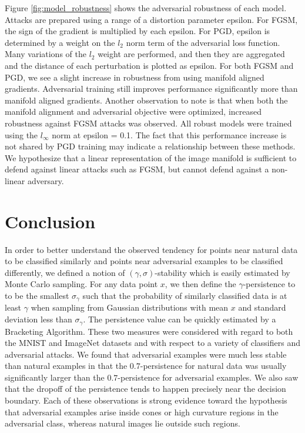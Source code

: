 Figure \ref{fig:model_robustness} shows the adversarial robustness of each model. Attacks are prepared using a range of a distortion parameter epsilon. For FGSM, the sign of the gradient is multiplied by each epsilon. For PGD, epsilon is determined by a weight on the $l_2$ norm term of the adversarial loss function. Many variations of the $l_2$ weight are performed, and then they are aggregated and the distance of each perturbation is plotted as epsilon. For both FGSM and PGD, we see a slight increase in robustness from using manifold aligned gradients. Adversarial training still improves performance significantly more than manifold aligned gradients. Another observation to note is that when both the manifold alignment and adversarial objective were optimized, increased robustness against FGSM attacks was observed. All robust models were trained using the $l_\infty$ norm at epsilon = 0.1. The fact that this performance increase is not shared by PGD training may indicate a relationship between these methods. We hypothesize that a linear representation of the image manifold is sufficient to defend against linear attacks such as FGSM, but cannot defend against a non-linear adversary.

\section{Conclusion}

In order to better understand the observed tendency for points near natural data to be classified similarly and points near
adversarial examples to be classified differently, we defined a notion of $(\gamma,\sigma)$-stability which is easily estimated by Monte Carlo sampling. For any data point $x$, we then define the $\gamma$-persistence to to be the smallest $\sigma_\gamma$ such that the probability of similarly classified data is at least $\gamma$ when sampling from Gaussian distributions with mean $x$ and standard deviation less than $\sigma_\gamma$. The persistence value can be quickly estimated by a Bracketing Algorithm. These two measures were considered with regard to both the MNIST and ImageNet datasets and with respect to a variety of classifiers and adversarial attacks. We found that adversarial examples were much less stable than natural examples in that the $0.7$-persistence for natural data was usually significantly larger than the $0.7$-persistence for adversarial examples. We also saw that the dropoff of the persistence tends to happen precisely near the decision boundary. Each of these observations is strong evidence toward the hypothesis that adversarial examples arise inside cones or high curvature regions in the adversarial class, whereas natural images lie outside such regions.

